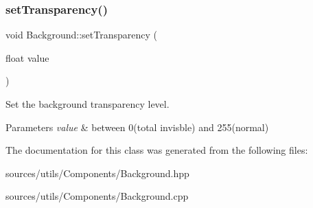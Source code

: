 \subsubsection{\texorpdfstring{set\+Transparency()}{setTransparency()}}
{\footnotesize\ttfamily void Background\+::set\+Transparency (\begin{DoxyParamCaption}\item[{float}]{value }\end{DoxyParamCaption})}



Set the background transparency level. 


\begin{DoxyParams}{Parameters}
{\em value} & between 0(total invisble) and 255(normal) \\
\hline
\end{DoxyParams}


The documentation for this class was generated from the following files\+:\begin{DoxyCompactItemize}
\item 
sources/utils/\+Components/Background.\+hpp\item 
sources/utils/\+Components/Background.\+cpp\end{DoxyCompactItemize}

